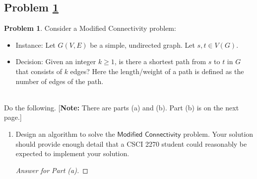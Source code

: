 \documentclass[11pt]{article}
\theoremstyle{definition}
\theoremstyle{definition}
\newtheorem{required}{Problem}
\theoremstyle{definition}
\begin{document}
\subsection{Problem \ref{DFS1}}
\begin{required} \label{DFS1}
Consider a \textsf{Modified Connectivity} problem:
\begin{itemize}
\item \textsf{Instance:} Let $G(V, E)$ be a simple, undirected graph. Let $s, t \in V(G)$.
\item \textsf{Decision:} Given an integer $k\geq 1$,  is there a shortest path from $s$ to $t$ in $G$ that consists of $k$ edges? Here the length/weight of a path is defined as the number of edges of the path. 
\end{itemize}

\noindent \\ Do the following. [\textbf{Note:} There are parts (a) and (b). Part (b) is on the next page.]
\begin{enumerate}[label=(\alph*)]
\item Design an algorithm to solve the $\textsf{Modified Connectivity}$ problem. Your solution should provide enough detail that a CSCI 2270 student could reasonably be expected to implement your solution.
\begin{proof}[Answer for Part (a)]


\end{proof}
\end{enumerate}
\end{required}
\end{document}
